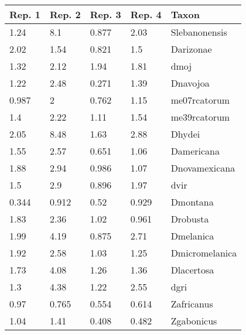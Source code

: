 \begin{tabular}{lllll}
\toprule
         Rep. 1 &          Rep. 2 &          Rep. 3 &          Rep. 4 &                   Taxon \\
\midrule
           1.24 &             8.1 &           0.877 &            2.03 &           Slebanonensis \\
           2.02 &            1.54 &           0.821 &             1.5 &               Darizonae \\
           1.32 &            2.12 &            1.94 &            1.81 &                    dmoj \\
           1.22 &            2.48 &           0.271 &            1.39 &                Dnavojoa \\
          0.987 &               2 &           0.762 &            1.15 &            me07rcatorum \\
            1.4 &            2.22 &            1.11 &            1.54 &            me39rcatorum \\
           2.05 &            8.48 &            1.63 &            2.88 &                  Dhydei \\
           1.55 &            2.57 &           0.651 &            1.06 &              Damericana \\
           1.88 &            2.94 &           0.986 &            1.07 &           Dnovamexicana \\
            1.5 &             2.9 &           0.896 &            1.97 &                    dvir \\
          0.344 &           0.912 &            0.52 &           0.929 &                Dmontana \\
           1.83 &            2.36 &            1.02 &           0.961 &                Drobusta \\
           1.99 &            4.19 &           0.875 &            2.71 &               Dmelanica \\
           1.92 &            2.58 &            1.03 &            1.25 &          Dmicromelanica \\
           1.73 &            4.08 &            1.26 &            1.36 &              Dlacertosa \\
            1.3 &            4.38 &            1.22 &            2.55 &                    dgri \\
           0.97 &           0.765 &           0.554 &           0.614 &              Zafricanus \\
           1.04 &            1.41 &           0.408 &           0.482 &              Zgabonicus \\

\end{tabular}
